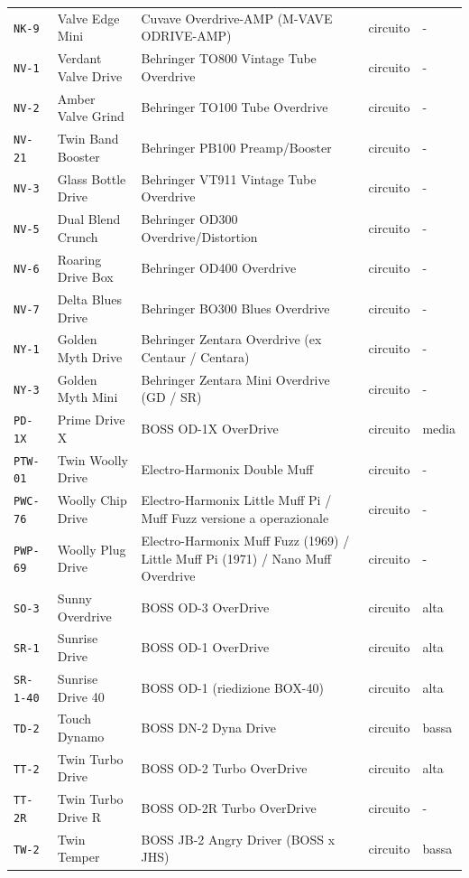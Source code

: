 \begin{xltabular}{\linewidth}{@{}l l X l l@{}}
\texttt{NK-9} & Valve Edge Mini & Cuvave Overdrive-AMP (M-VAVE ODRIVE-AMP) & circuito & -\\
\texttt{NV-1} & Verdant Valve Drive & Behringer TO800 Vintage Tube Overdrive & circuito & -\\
\texttt{NV-2} & Amber Valve Grind & Behringer TO100 Tube Overdrive & circuito & -\\
\texttt{NV-21} & Twin Band Booster & Behringer PB100 Preamp/Booster & circuito & -\\
\texttt{NV-3} & Glass Bottle Drive & Behringer VT911 Vintage Tube Overdrive & circuito & -\\
\texttt{NV-5} & Dual Blend Crunch & Behringer OD300 Overdrive/Distortion & circuito & -\\
\texttt{NV-6} & Roaring Drive Box & Behringer OD400 Overdrive & circuito & -\\
\texttt{NV-7} & Delta Blues Drive & Behringer BO300 Blues Overdrive & circuito & -\\
\texttt{NY-1} & Golden Myth Drive & Behringer Zentara Overdrive (ex Centaur / Centara) & circuito & -\\
\texttt{NY-3} & Golden Myth Mini & Behringer Zentara Mini Overdrive (GD / SR) & circuito & -\\
\texttt{PD-1X} & Prime Drive X & BOSS OD-1X OverDrive & circuito & media\\
\texttt{PTW-01} & Twin Woolly Drive & Electro-Harmonix Double Muff & circuito & -\\
\texttt{PWC-76} & Woolly Chip Drive & Electro-Harmonix Little Muff Pi / Muff Fuzz versione a operazionale & circuito & -\\
\texttt{PWP-69} & Woolly Plug Drive & Electro-Harmonix Muff Fuzz (1969) / Little Muff Pi (1971) / Nano Muff Overdrive & circuito & -\\
\texttt{SO-3} & Sunny Overdrive & BOSS OD-3 OverDrive & circuito & alta\\
\texttt{SR-1} & Sunrise Drive & BOSS OD-1 OverDrive & circuito & alta\\
\texttt{SR-1-40} & Sunrise Drive 40 & BOSS OD-1 (riedizione BOX-40) & circuito & alta\\
\texttt{TD-2} & Touch Dynamo & BOSS DN-2 Dyna Drive & circuito & bassa\\
\texttt{TT-2} & Twin Turbo Drive & BOSS OD-2 Turbo OverDrive & circuito & alta\\
\texttt{TT-2R} & Twin Turbo Drive R & BOSS OD-2R Turbo OverDrive & circuito & -\\
\texttt{TW-2} & Twin Temper & BOSS JB-2 Angry Driver (BOSS x JHS) & circuito & bassa\\

\end{xltabular}
